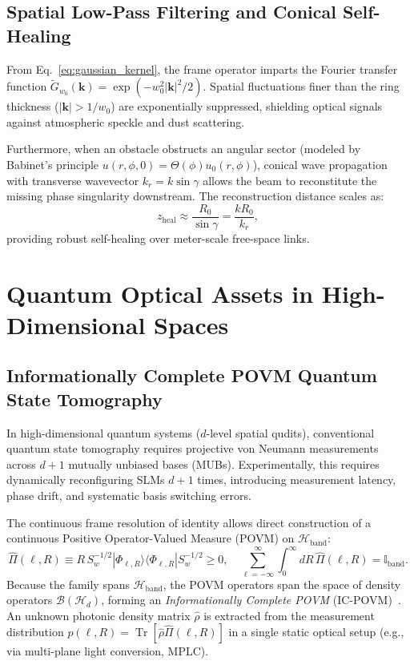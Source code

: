\documentclass[11pt,a4paper]{article}
\begin{document}
\subsection{Spatial Low-Pass Filtering and Conical Self-Healing}

From Eq.~\eqref{eq:gaussian_kernel}, the frame operator imparts the Fourier transfer function $\widetilde{G}_{w_0}(\mathbf{k}) = \exp(-w_0^2 |\mathbf{k}|^2 / 2)$. Spatial fluctuations finer than the ring thickness ($|\mathbf{k}| > 1/w_0$) are exponentially suppressed, shielding optical signals against atmospheric speckle and dust scattering.

Furthermore, when an obstacle obstructs an angular sector (modeled by Babinet's principle $u(r, \phi, 0) = \Theta(\phi) u_0(r, \phi)$), conical wave propagation with transverse wavevector $k_r = k \sin \gamma$ allows the beam to reconstitute the missing phase singularity downstream. The reconstruction distance scales as:
\begin{equation}
z_{\text{heal}} \approx \frac{R_0}{\sin \gamma} = \frac{k R_0}{k_r},
\label{eq:self_healing_distance}
\end{equation}
providing robust self-healing over meter-scale free-space links.

\section{Quantum Optical Assets in High-Dimensional Spaces}
\label{sec:quantum_assets}

\subsection{Informationally Complete POVM Quantum State Tomography}

In high-dimensional quantum systems ($d$-level spatial qudits), conventional quantum state tomography requires projective von Neumann measurements across $d+1$ mutually unbiased bases (MUBs). Experimentally, this requires dynamically reconfiguring SLMs $d+1$ times, introducing measurement latency, phase drift, and systematic basis switching errors.

The continuous frame resolution of identity allows direct construction of a continuous Positive Operator-Valued Measure (POVM) on $\mathcal{H}_{\text{band}}$:
\begin{equation}
\boxed{\hat{\Pi}(\ell, R) \equiv R \, S_w^{-1/2} |\Phi_{\ell, R}\rangle \langle \Phi_{\ell, R}| S_w^{-1/2} \ge 0, \quad \sum_{\ell=-\infty}^\infty \int_0^\infty dR \, \hat{\Pi}(\ell, R) = \mathbb{I}_{\text{band}}.}
\label{eq:povm_def}
\end{equation}
Because the family spans $\mathcal{H}_{\text{band}}$, the POVM operators span the space of density operators $\mathcal{B}(\mathcal{H}_d)$, forming an \emph{Informationally Complete POVM} (IC-POVM)~\cite{Renes2004,BraunsteinCaves1994}. An unknown photonic density matrix $\hat{\rho}$ is extracted from the measurement distribution $p(\ell, R) = \operatorname{Tr}[\hat{\rho} \hat{\Pi}(\ell, R)]$ in a single static optical setup (e.g., via multi-plane light conversion, MPLC).
\end{document}
